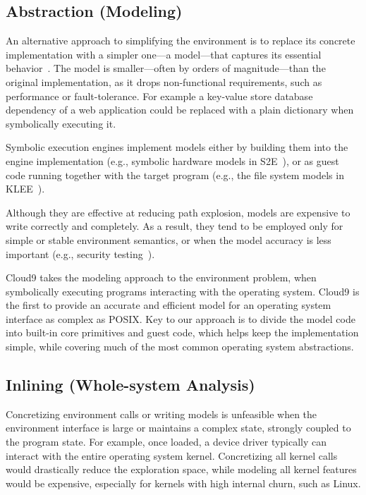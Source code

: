 \subsection{Abstraction (Modeling)}

An alternative approach to simplifying the environment is to replace its concrete implementation with a simpler one---a model---that captures its essential behavior~\cite{klee,mayhem,aeg}.
%
The model is smaller---often by orders of magnitude---than the original implementation, as it drops non-functional requirements, such as performance or fault-tolerance.  For example a key-value store database dependency of a web application could be replaced with a plain dictionary when symbolically executing it.

Symbolic execution engines implement models either by building them into the engine implementation (e.g., symbolic hardware models in S2E~\cite{s2eSystem}), or as guest code running together with the target program (e.g., the file system models in KLEE~\cite{klee}).

Although they are effective at reducing path explosion, models are expensive to write correctly and completely.  As a result, they tend to be employed only for simple or stable environment semantics, or when the model accuracy is less important (e.g., security testing~\cite{aeg}).

Cloud9 takes the modeling approach to the environment problem, when symbolically executing programs interacting with the operating system.  Cloud9 is the first to provide an accurate and efficient model for an operating system interface as complex as POSIX.  Key to our approach is to divide the model code into built-in core primitives and guest code, which helps keep the implementation simple, while covering much of the most common operating system abstractions.

\subsection{Inlining (Whole-system Analysis)}

Concretizing environment calls or writing models is unfeasible when the environment interface is large or maintains a complex state, strongly coupled to the program state.
%
For example, once loaded, a device driver typically can interact with the entire operating system kernel.  Concretizing all kernel calls would drastically reduce the exploration space, while modeling all kernel features would be expensive, especially for kernels with high internal churn, such as Linux.

